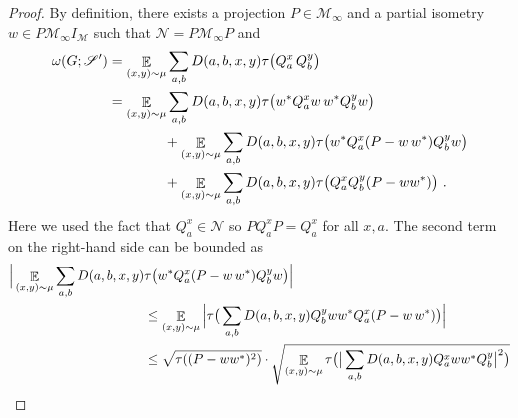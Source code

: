 \documentclass[11pt]{article}
\theoremstyle{definition}
\newcommand{\strategy}{\mathscr{S}}
\newcommand{\ket}[1]{|#1\rangle}
\newcommand{\bra}[1]{\langle#1|}
\DeclareMathOperator*{\Expectation}{\mathbb{E}}
\newcommand{\Es}[1]{\Expectation_{#1}}
\newcommand{\mM}{\ensuremath{\mathcal{M}}}
\newcommand{\eps}{\varepsilon}
\newcommand{\mN}{\mathcal{N}}
\begin{document}
\begin{proof}
By definition, there exists a projection $P \in \mM_\infty$ and a partial isometry $w \in P \mM_\infty I_\mM$ such that $\mN = P \mM_\infty P$ and
\begin{align}
\omega(G;\strategy') &= \Es{(x,y)\sim\mu} \sum_{a,b} D(a,b,x,y)  \tau\big( Q^x_a \, Q^y_b \big)\notag\\
&=  \Es{(x,y)\sim\mu} \sum_{a,b} D(a,b,x,y)  \tau\big( w^* Q^x_a w\, w^* Q^y_b w\big)\notag\\
&\qquad\qquad+  \Es{(x,y)\sim\mu} \sum_{a,b} D(a,b,x,y)  \tau\big( w^* Q^x_a (P - w\, w^* ) Q^y_b w\big) \notag\\
&\qquad\qquad+ \Es{(x,y)\sim\mu} \sum_{a,b} D(a,b,x,y)  \tau\big(Q^x_a  Q^y_b (P-ww^*)\big)~.\label{eq:cv-0}
\end{align}
Here we used the fact that $Q^x_a \in \mN$ so $P Q^x_a P = Q^x_a$ for all $x,a$. 
The second term on the right-hand side can be bounded as
\begin{align}
\Big|\Es{(x,y)\sim\mu} \sum_{a,b} D(a,b,x,y) & \tau\big( w^* Q^x_a (P - w\, w^* ) Q^y_b w\big)\Big|\notag\\
&\leq \Es{(x,y)\sim\mu} \Big | \tau\big( \sum_{a,b} D(a,b,x,y)   Q^y_b w w^* Q^x_a (P - w\, w^* ) \big) \Big | \notag\\
&\leq \sqrt{ \tau((P - ww^*)^2)} \cdot \sqrt{\Es{(x,y)\sim\mu} \tau\big( \big| \sum_{a,b} D(a,b,x,y)   Q^x_a w w^* Q^y_b \big|^2 \big) } \notag\\

\end{align}
\end{proof}
\end{document}
